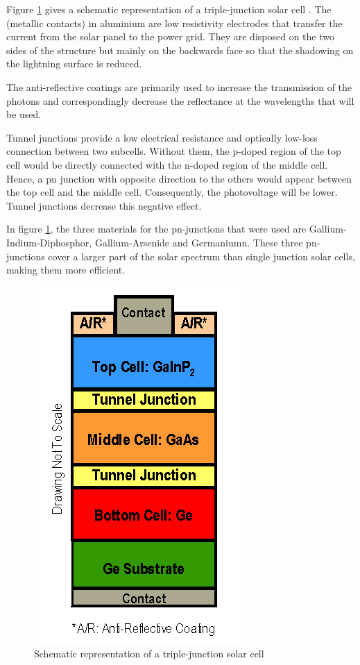 Figure \ref{fig:multij_cell} gives a schematic representation of a triple-junction solar cell \cite{spectrolab}. The (metallic contacts) in aluminium are low resistivity electrodes that transfer the current from the solar panel to the power grid. They are disposed on the two sides of the structure but mainly on the backwards face so that the shadowing on the lightning surface is reduced.

The anti-reflective coatings are primarily used to increase the transmission of the photons and correspondingly decrease the reflectance at the wavelengths that will be used.

Tunnel junctions provide a low electrical resistance and optically low-loss connection between two subcells. Without them, the p-doped region of the top cell would be directly connected with the n-doped region of the middle cell. Hence, a pn junction with opposite direction to the others would appear between the top cell and the middle cell. Consequently, the photovoltage will be lower. Tunnel junctions decrease this negative effect.

In figure \ref{fig:multij_cell}, the three materials for the pn-junctions that were used are Gallium-Indium-Diphosphor, Gallium-Arsenide and Germaniumn. These three pn-junctions cover a larger part of the solar spectrum than single junction solar cells, making them more efficient.

\begin{figure}[H]
\centering
\includegraphics{chapters/img/multijunction_solar_cell.png}
\caption{Schematic representation of a triple-junction solar cell}
\label{fig:multij_cell}
\end{figure}

